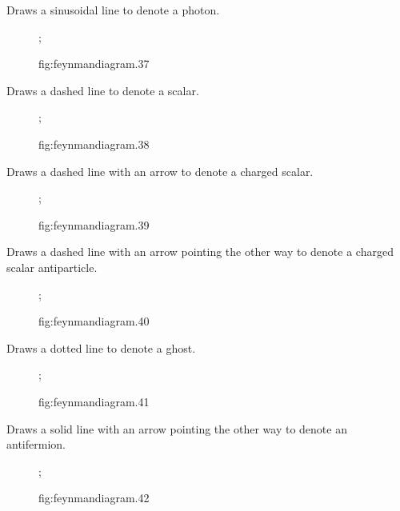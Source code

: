 \documentclass[UTF8]{article}
\begin{document}
Draws a sinusoidal line to denote a photon.

\begin{figure}[hp]
    \centering
    ;
    \caption{fig:feynmandiagram.37}
    \label{fig:feynmandiagram.37}
\end{figure}

Draws a dashed line to denote a scalar.

\begin{figure}[hp]
    \centering
    ;
    \caption{fig:feynmandiagram.38}
    \label{fig:feynmandiagram.38}
\end{figure}

Draws a dashed line with an arrow to denote a charged scalar.

\begin{figure}[hp]
    \centering
    ;
    \caption{fig:feynmandiagram.39}
    \label{fig:feynmandiagram.39}
\end{figure}

Draws a dashed line with an arrow pointing the other way to denote a charged scalar antiparticle.

\begin{figure}[hp]
    \centering
    ;
    \caption{fig:feynmandiagram.40}
    \label{fig:feynmandiagram.40}
\end{figure}

Draws a dotted line to denote a ghost.

\begin{figure}[hp]
    \centering
    ;
    \caption{fig:feynmandiagram.41}
    \label{fig:feynmandiagram.41}
\end{figure}

Draws a solid line with an arrow pointing the other way to denote an antifermion.

\begin{figure}[hp]
    \centering
    ;
    \caption{fig:feynmandiagram.42}
    \label{fig:feynmandiagram.42}
\end{figure}
\end{document}
